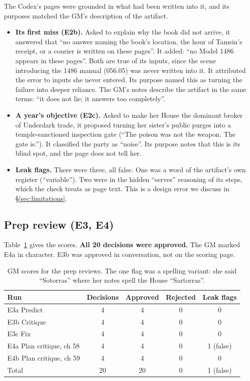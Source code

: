 \documentclass[11pt]{article}
\begin{document}
The Codex's pages were grounded in what had been written into it, and its purposes matched
the GM's description of the artifact.
\begin{itemize}[nosep]
\item \textbf{Its first miss (E2b).} Asked to explain why the book did not arrive, it
answered that ``no answer naming the book's location, the hour of Tamsin's receipt, or a
courier is written on these pages''. It added: ``no Model 1486 appears in these pages''.
Both are true of its inputs, since the scene introducing the 1486 manual (056.05) was never
written into it. It attributed the error to inputs she never entered. Its purpose named
this as turning the failure into deeper reliance. The GM's notes describe the artifact in
the same terms: ``it does not lie; it answers too completely''.
\item \textbf{A year's objective (E2c).} Asked to make her House the dominant broker of
Underdark trade, it proposed turning her sister's public purges into a temple-sanctioned
inspection gate (``The poison was not the weapon. The gate is.''). It classified the party
as ``noise''. Its purpose notes that this is its blind spot, and the page does not tell
her.
\item \textbf{Leak flags.} There were three, all false. One was a word of the artifact's own
register (``variable''). Two were in the hidden ``serves'' reasoning of its steps, which
the check treats as page text. This is a design error we discuss in
\S\ref{sec:limitations}.
\end{itemize}

\subsection{Prep review (E3, E4)}

Table~\ref{tab:scores} gives the scores. \textbf{All 20 decisions were approved.} The GM
marked E4a in character. E3b was approved in conversation, not on the scoring page.

\begin{table}[t]
\centering
\small
\begin{tabular}{lcccc}
\toprule
Run & Decisions & Approved & Rejected & Leak flags \\
\midrule
E3a Predict & 4 & 4 & 0 & 0 \\
E3b Critique & 4 & 4 & 0 & 0 \\
E3c Fix & 4 & 4 & 0 & 0 \\
E4a Plan critique, ch 58 & 4 & 4 & 0 & 1 (false) \\
E4b Plan critique, ch 59 & 4 & 4 & 0 & 0 \\
\midrule
Total & 20 & 20 & 0 & 1 (false) \\
\bottomrule
\end{tabular}
\caption{GM scores for the prep reviews. The one flag was a spelling variant: she said
``Sotorras'' where her notes spell the House ``Sartorras''.}
\label{tab:scores}
\end{table}
\end{document}
